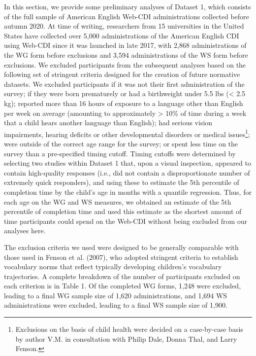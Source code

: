 \documentclass[
  english,
  ,man,floatsintext]{apa6}
\begin{document}
In this section, we provide some preliminary analyses of Dataset 1, which consists of the full sample of American English Web-CDI administrations collected before autumn 2020. At time of writing, researchers from 15 universities in the United States have collected over 5,000 administrations of the American English CDI using Web-CDI since it was launched in late 2017, with 2,868 administrations of the WG form before exclusions and 3,594 administrations of the WS form before exclusions. We excluded participants from the subsequent analyses based on the following set of stringent criteria designed for the creation of future normative datasets. We excluded participants if it was not their first administration of the survey; if they were born prematurely or had a birthweight under 5.5 lbs (\textless{} 2.5 kg); reported more than 16 hours of exposure to a language other than English per week on average (amounting to approximately \textgreater{} 10\% of time during a week that a child hears another language than English); had serious vision impairments, hearing deficits or other developmental disorders or medical issues\footnote{Exclusions on the basis of child health were decided on a case-by-case basis by author V.M. in consultation with Philip Dale, Donna Thal, and Larry Fenson.}; were outside of the correct age range for the survey; or spent less time on the survey than a pre-specified timing cutoff. Timing cutoffs were determined by selecting two studies within Dataset 1 that, upon a visual inspection, appeared to contain high-quality responses (i.e., did not contain a disproportionate number of extremely quick responders), and using these to estimate the 5th percentile of completion time by the child's age in months with a quantile regression. Thus, for each age on the WG and WS measures, we obtained an estimate of the 5th percentile of completion time and used this estimate as the shortest amount of time participants could spend on the Web-CDI without being excluded from our analyses here.

The exclusion criteria we used were designed to be generally comparable with those used in Fenson et al. (2007), who adopted stringent criteria to establish vocabulary norms that reflect typically developing children's vocabulary trajectories. A complete breakdown of the number of participants excluded on each criterion is in Table 1. Of the completed WG forms, 1,248 were excluded, leading to a final WG sample size of 1,620 administrations, and 1,694 WS administrations were excluded, leading to a final WS sample size of 1,900.
\end{document}
